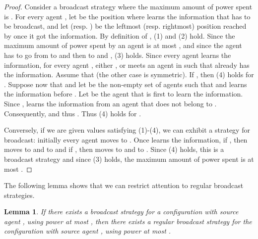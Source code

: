 \documentclass{article}
\newtheorem{lemma}{Lemma}
\begin{document}
\begin{proof}
Consider a broadcast strategy  where the maximum amount of power
spent is .  For every agent , let  be the position where
 learns the information that has to be broadcast, and let 
(resp. ) be the leftmost (resp. rightmost) position reached by
 once it got the information.  By definition of ,
(1) and (2) hold. Since the maximum amount of power spent by an agent
is at most , and since the agent has to go from  to 
and then to  and , (3) holds.  Since every agent learns the
information, for every agent , either , or  meets
an agent  in  such that  already has the information.
Assume that  (the other case is symmetric). If , then (4) holds for .  Suppose now that  and let  be the non-empty set of agents  such that
 and  learns the information before . Let  be the agent that is first to learn the information. Since ,  learns the information from an agent 
that does not belong to . Consequently,  and
thus . Thus (4) holds
for . 

Conversely, if we are given values  satisfying (1)-(4),
we can exhibit a strategy for broadcast: initially every agent
 moves to . Once  learns the information, if
, then  moves to  and to
 and if , then  moves to  and
to . Since (4) holds, this is a broadcast strategy and since (3) holds, the maximum amount of power spent is at most . 
\end{proof}

\medskip

The following lemma shows that we can restrict attention to regular broadcast strategies.

\begin{lemma}\label{lem-shape-algo-b}
If there exists a broadcast strategy for a configuration
 with source agent , using power at most , then there exists a regular broadcast strategy for the configuration
 with source agent , using power at most .
\end{lemma} 
\end{document}
